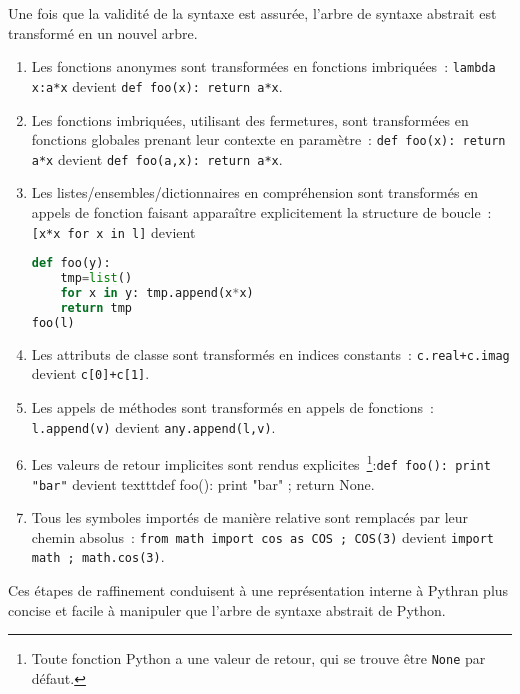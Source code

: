 \documentclass[renpar]{compas2013}
\begin{document}
Une fois que la validité de la syntaxe est assurée, l'arbre de syntaxe
abstrait est transformé en un nouvel arbre.
\begin{enumerate}

  \item Les fonctions anonymes sont transformées en fonctions imbriquées~:
	\texttt{lambda x:a*x} devient \texttt{def foo(x): return a*x}.

  \item Les fonctions imbriquées, utilisant des fermetures, sont
	transformées en fonctions globales prenant leur contexte en
	paramètre~: \texttt{def foo(x): return a*x} devient \texttt{def
	foo(a,x): return a*x}.

  \item Les listes/ensembles/dictionnaires en compréhension sont
	transformés en appels de fonction faisant apparaître explicitement la
	structure de boucle~:\texttt{[x*x for x in l]} devient
\begin{lstlisting}[language=python]
def foo(y):
	tmp=list()
	for x in y: tmp.append(x*x)
	return tmp
foo(l)
\end{lstlisting}

  \item Les attributs de classe sont transformés en indices constants~:
	\texttt{c.real+c.imag} devient \texttt{c[0]+c[1]}.

  \item Les appels de méthodes sont transformés en appels de fonctions~:
	\texttt{l.append(v)} devient \texttt{any.append(l,v)}.

  \item Les valeurs de retour implicites sont rendus
	explicites~\footnote{Toute fonction Python a une valeur de retour, qui
	se trouve être \texttt{None} par défaut.}:\texttt{def foo(): print
	"bar"} devient texttt{def foo(): print "bar" ; return None}.

  \item Tous les symboles importés de manière relative sont remplacés par
	leur chemin absolus~: \texttt{from math import cos as COS ; COS(3)}
	devient \texttt{import math ; math.cos(3)}.

\end{enumerate}

Ces étapes de raffinement conduisent à une représentation interne à
Pythran plus concise et facile à manipuler que l'arbre de syntaxe abstrait
de Python. 
\end{document}
